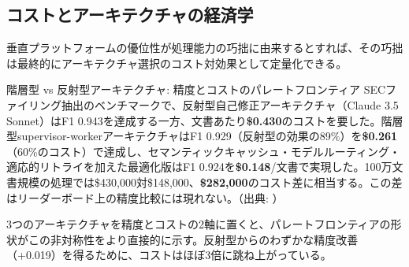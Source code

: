 \subsection{コストとアーキテクチャの経済学}

垂直プラットフォームの優位性が処理能力の巧拙に由来するとすれば、その巧拙は最終的にアーキテクチャ選択のコスト対効果として定量化できる。

\begin{casestudy}{階層型 vs 反射型アーキテクチャ: 精度とコストのパレートフロンティア}
SECファイリング抽出のベンチマークで、反射型自己修正アーキテクチャ（Claude 3.5 Sonnet）はF1 0.943を達成する一方、文書あたり\textbf{\$0.430}のコストを要した。階層型supervisor-workerアーキテクチャはF1 0.929（反射型の効果の89\%）を\textbf{\$0.261}（60\%のコスト）で達成し、セマンティックキャッシュ・モデルルーティング・適応的リトライを加えた最適化版はF1 0.924を\textbf{\$0.148}/文書で実現した。100万文書規模の処理では\$430,000対\$148,000、\textbf{\$282,000}のコスト差に相当する。この差はリーダーボード上の精度比較には現れない。（出典: \cite{benchmarkingmultiagent2026}）
\end{casestudy}

3つのアーキテクチャを精度とコストの2軸に置くと、パレートフロンティアの形状がこの非対称性をより直接的に示す。反射型からのわずかな精度改善（+0.019）を得るために、コストはほぼ3倍に跳ね上がっている。

